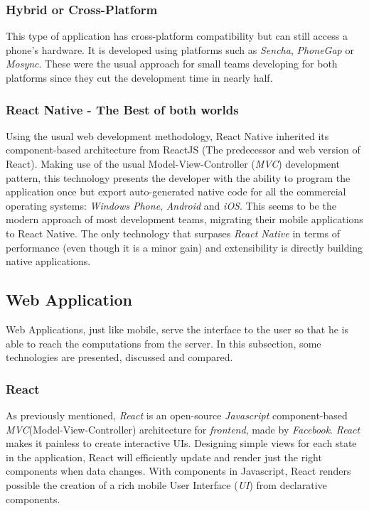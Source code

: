\subsubsection{Hybrid or Cross-Platform}

This type of application has cross-platform compatibility but can still access a phone’s hardware. It is developed using platforms such as \emph{Sencha}, \emph{PhoneGap} or \emph{Mosync}. These were the usual approach for small teams developing for both platforms since they cut the development time in nearly half.

\subsubsection{React Native - The Best of both worlds}

Using the usual web development methodology, React Native inherited its component-based architecture from ReactJS (The predecessor and web version of React). Making use of the usual Model-View-Controller (\emph{MVC}) development pattern, this technology presents the developer with the ability to program the application once but export auto-generated native code for all the commercial operating systems: \emph{Windows Phone}, \emph{Android} and \emph{iOS}. This seems to be the modern approach of most development teams, migrating their mobile applications to React Native. The only technology that surpases \emph{React Native} in terms of performance (even though it is a minor gain) and extensibility is directly building native applications. 

\subsection{Web Application}

Web Applications, just like mobile, serve the interface to the user so that he is able to reach the computations from the server. In this subsection, some technologies are presented, discussed and compared.

\subsubsection{React}

As previously mentioned, \emph{React} is an open-source \emph{Javascript} component-based \emph{MVC}(Model-View-Controller) architecture for \emph{frontend}, made by \emph{Facebook}. \emph{React} makes it painless to create interactive UIs. Designing simple views for each state in the application, React will efficiently update and render just the right components when data changes. With components in Javascript, React renders possible the creation of a rich mobile User Interface (\textit{UI}) from declarative components.

